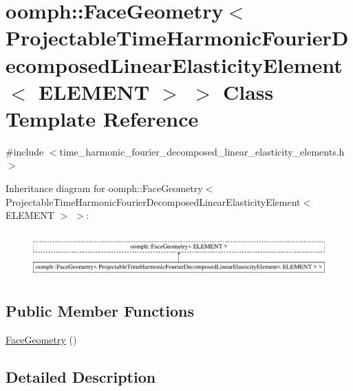 \hypertarget{classoomph_1_1FaceGeometry_3_01ProjectableTimeHarmonicFourierDecomposedLinearElasticityElement_3_01ELEMENT_01_4_01_4}{}\section{oomph\+:\+:Face\+Geometry$<$ Projectable\+Time\+Harmonic\+Fourier\+Decomposed\+Linear\+Elasticity\+Element$<$ E\+L\+E\+M\+E\+NT $>$ $>$ Class Template Reference}
\label{classoomph_1_1FaceGeometry_3_01ProjectableTimeHarmonicFourierDecomposedLinearElasticityElement_3_01ELEMENT_01_4_01_4}


{\ttfamily \#include $<$time\+\_\+harmonic\+\_\+fourier\+\_\+decomposed\+\_\+linear\+\_\+elasticity\+\_\+elements.\+h$>$}

Inheritance diagram for oomph\+:\+:Face\+Geometry$<$ Projectable\+Time\+Harmonic\+Fourier\+Decomposed\+Linear\+Elasticity\+Element$<$ E\+L\+E\+M\+E\+NT $>$ $>$\+:\begin{figure}[H]
\begin{center}
\leavevmode
\includegraphics[height=1.747270cm]{classoomph_1_1FaceGeometry_3_01ProjectableTimeHarmonicFourierDecomposedLinearElasticityElement_3_01ELEMENT_01_4_01_4}
\end{center}
\end{figure}
\subsection*{Public Member Functions}
\begin{DoxyCompactItemize}
\item 
\hyperlink{classoomph_1_1FaceGeometry_3_01ProjectableTimeHarmonicFourierDecomposedLinearElasticityElement_3_01ELEMENT_01_4_01_4_a85f4d38c887873bbb076933397fc77a2}{Face\+Geometry} ()
\end{DoxyCompactItemize}


\subsection{Detailed Description}
